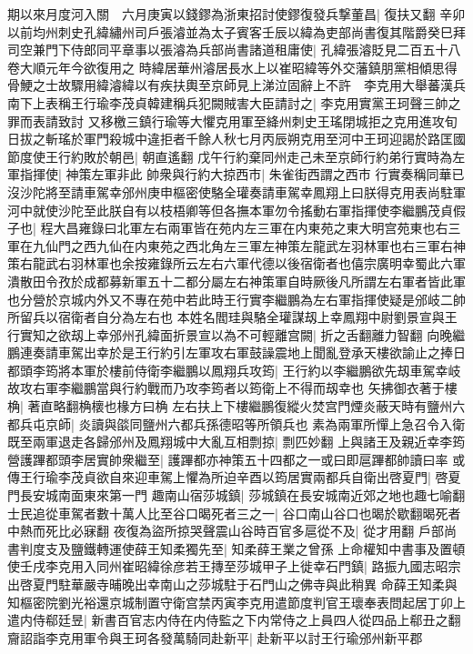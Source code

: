 期以來月度河入關　六月庚寅以錢鏐為浙東招討使鏐復發兵撃董昌|{
	復扶又翻}
辛卯以前均州刺史孔緯繡州司戶張濬並為太子賓客壬辰以緯為吏部尚書復其階爵癸巳拜司空兼門下侍郎同平章事以張濬為兵部尚書諸道租庸使|{
	孔緯張濬貶見二百五十八卷大順元年今欲復用之}
時緯居華州濬居長水上以崔昭緯等外交藩鎮朋黨相傾思得骨鯁之士故驟用緯濬緯以有疾扶輿至京師見上涕泣固辭上不許　李克用大舉蕃漢兵南下上表稱王行瑜李茂貞韓建稱兵犯闕賊害大臣請討之|{
	李克用實黨王珂聲三帥之罪而表請致討}
又移檄三鎮行瑜等大懼克用軍至絳州刺史王瑤閉城拒之克用進攻旬日拔之斬瑤於軍門殺城中違拒者千餘人秋七月丙辰朔克用至河中王珂迎謁於路匡國節度使王行約敗於朝邑|{
	朝直遙翻}
戊午行約棄同州走己未至京師行約弟行實時為左軍指揮使|{
	神策左軍非此}
帥衆與行約大掠西市|{
	朱雀街西謂之西市}
行實奏稱同華已沒沙陀將至請車駕幸邠州庚申樞密使駱全瓘奏請車駕幸鳳翔上曰朕得克用表尚駐軍河中就使沙陀至此朕自有以枝梧卿等但各撫本軍勿令搖動右軍指揮使李繼鵬茂貞假子也|{
	程大昌雍錄曰北軍左右兩軍皆在苑内左三軍在内東苑之東大明宫苑東也右三軍在九仙門之西九仙在内東苑之西北角左三軍左神策左龍武左羽林軍也右三軍右神策右龍武右羽林軍也余按雍錄所云左右六軍代德以後宿衛者也僖宗廣明幸蜀此六軍潰散田令孜於成都募新軍五十二都分屬左右神策軍自時厥後凡所謂左右軍者皆此軍也分營於京城内外又不專在苑中若此時王行實李繼鵬為左右軍指揮使疑是邠岐二帥所留兵以宿衛者自分為左右也}
本姓名閻珪與駱全瓘謀刼上幸鳳翔中尉劉景宣與王行實知之欲刼上幸邠州孔緯面折景宣以為不可輕離宫闕|{
	折之舌翻離力智翻}
向晚繼鵬連奏請車駕出幸於是王行約引左軍攻右軍鼓譟震地上聞亂登承天樓欲諭止之捧日都頭李筠將本軍於樓前侍衛李繼鵬以鳳翔兵攻筠|{
	王行約以李繼鵬欲先刼車駕幸岐故攻右軍李繼鵬當與行約戰而乃攻李筠者以筠衛上不得而刼幸也}
矢拂御衣著于樓桷|{
	著直略翻桷櫰也椽方曰桷}
左右扶上下樓繼鵬復縱火焚宫門煙炎蔽天時有鹽州六都兵屯京師|{
	炎讀與燄同鹽州六都兵孫德昭等所領兵也}
素為兩軍所憚上急召令入衛既至兩軍退走各歸邠州及鳳翔城中大亂互相剽掠|{
	剽匹妙翻}
上與諸王及親近幸李筠營護蹕都頭李居實帥衆繼至|{
	護蹕都亦神策五十四都之一或曰即扈蹕都帥讀曰率}
或傳王行瑜李茂貞欲自來迎車駕上懼為所迫辛酉以筠居實兩都兵自衛出啓夏門|{
	啓夏門長安城南面東來第一門}
趣南山宿莎城鎮|{
	莎城鎮在長安城南近郊之地也趣七喻翻}
士民追從車駕者數十萬人比至谷口暍死者三之一|{
	谷口南山谷口也暍於歇翻暍死者中熱而死比必寐翻}
夜復為盜所掠哭聲震山谷時百官多扈從不及|{
	從才用翻}
戶部尚書判度支及鹽鐵轉運使薛王知柔獨先至|{
	知柔薛王業之曾孫}
上命權知中書事及置頓使壬戌李克用入同州崔昭緯徐彦若王摶至莎城甲子上徙幸石門鎮|{
	路振九國志昭宗出啓夏門駐華嚴寺晡晚出幸南山之莎城駐于石門山之佛寺與此稍異}
命薛王知柔與知樞密院劉光裕還京城制置守衛宫禁丙寅李克用遣節度判官王瓌奉表問起居丁卯上遣内侍郗廷昱|{
	新書百官志内侍在内侍監之下内常侍之上員四人從四品上郗丑之翻}
齎詔詣李克用軍令與王珂各發萬騎同赴新平|{
	赴新平以討王行瑜邠州新平郡}
